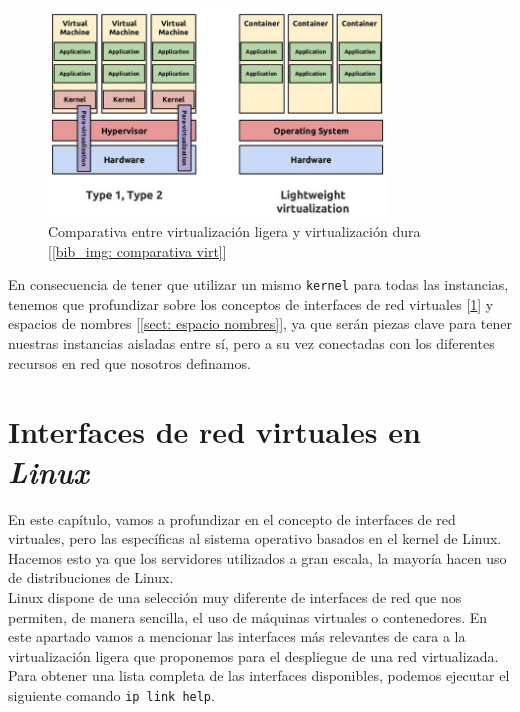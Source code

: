 \documentclass[12pt]{article}
\begin{document}
	\begin{figure}[h!]
		\begin{center}
			\includegraphics[width=0.8\textwidth]{img/virtualization_comparative.png}
			\caption{Comparativa entre virtualización ligera y virtualización dura [\ref{bib_img: comparativa virt}] }
			\label{img: virtualization comparative}
		\end{center}
	\end{figure}
	
	\noindent En consecuencia de tener que utilizar un mismo \texttt{kernel} para todas las instancias, tenemos que profundizar sobre los conceptos de interfaces de red virtuales [\ref{sect: interfaces virtuales}] y espacios de nombres [\ref{sect: espacio nombres}], ya que serán piezas clave para tener nuestras instancias aisladas entre sí, pero a su vez conectadas con los diferentes recursos en red que nosotros definamos.
	
	\pagebreak
	
	\section{Interfaces de red virtuales en \textit{Linux}}
	\label{sect: interfaces virtuales}
	\noindent En este capítulo, vamos a profundizar en el concepto de interfaces de red virtuales, pero las específicas al sistema operativo basados en el kernel de Linux. Hacemos esto ya que los servidores utilizados a gran escala, la mayoría hacen uso de distribuciones de Linux. \\ %
	
	\noindent Linux dispone de una selección muy diferente de interfaces de red que nos permiten, de manera sencilla, el uso de máquinas virtuales o contenedores. En este apartado vamos a mencionar las interfaces más relevantes de cara a la virtualización ligera que proponemos para el despliegue de una red virtualizada. Para obtener una lista completa de las interfaces disponibles, podemos ejecutar el siguiente comando \texttt{ip link help}.\\
	
\end{document}
